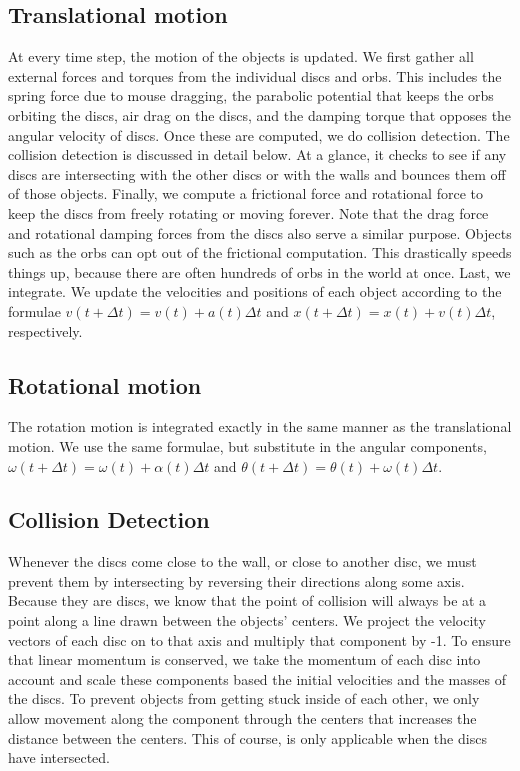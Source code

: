 \documentclass[pdftext,twoside,10pt]{article}
\begin{document}
\subsection{Translational motion}
At every time step, the motion of the objects is updated. We first gather all external forces and torques from the individual discs and orbs. This includes the spring force due to mouse dragging, the parabolic potential that keeps the orbs orbiting the discs, air drag on the discs, and the damping torque that opposes the angular velocity of discs. Once these are computed, we do collision detection. The collision detection is discussed in detail below. At a glance, it checks to see if any discs are intersecting with the other discs or with the walls and bounces them off of those objects. Finally, we compute a frictional force and rotational force to keep the discs from freely rotating or moving forever. Note that the drag force and rotational damping forces from the discs also serve a similar purpose. Objects such as the orbs can opt out of the frictional computation. This drastically speeds things up, because there are often hundreds of orbs in the world at once. Last, we integrate. We update the velocities and positions of each object according to the formulae  $v(t + \Delta t) = v(t) + a(t)\Delta t$ and  $x(t + \Delta t) = x(t) + v(t)\Delta t$, respectively.

\subsection{Rotational motion}
The rotation motion is integrated exactly in the same manner as the translational motion. We use the same formulae, but substitute in the angular components, $\omega(t + \Delta t) = \omega(t) + \alpha(t)\Delta t$ and  $\theta(t + \Delta t) = \theta(t) + \omega(t)\Delta t$.


\subsection{Collision Detection}
Whenever the discs come close to the wall, or close to another disc, we must prevent them by intersecting by reversing their directions along some axis. Because they are discs, we know that the point of collision will always be at a point along a line drawn between the objects' centers. We project the velocity vectors of each disc on to that axis and multiply that component by -1. To ensure that linear momentum is conserved, we take the momentum of each disc into account and scale these components based the initial velocities and the masses of the discs. To prevent objects from getting stuck inside of each other, we only allow movement along the component through the centers that increases the distance between the centers. This of course, is only applicable when the discs have intersected. 
\end{document}
